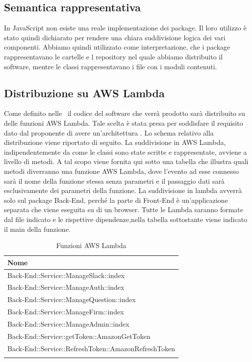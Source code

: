 \documentclass[../DefinizioneDiProdotto_v2.0.0.tex]{subfiles}
\begin{document}
\subsection{Semantica rappresentativa}
In JavaScript non esiste una reale implementazione dei package. Il loro utilizzo è stato quindi dichiarato per rendere una chiara suddivisione logica dei vari componenti.
Abbiamo quindi utilizzato come interpretazione, che i package rappresentavano le cartelle e l repository nel quale abbiamo distribuito il software, mentre le classi rappresentavano i file con i moduli contenuti.

\subsection{Distribuzione su AWS Lambda}
Come definito nelle \normediprogettov\ il codice del software che verrà prodotto sarà distribuito su delle funzioni AWS Lambda. Tale scelta è stata presa per soddisfare il requisito dato dal proponente di avere un'architettura . Lo schema relativo alla distribuzione viene riportato di seguito.
La suddivisione in AWS Lambda, indipendentemente da come le classi sono state scritte
e rappresentate, avviene a livello di metodi. A tal scopo viene fornita qui sotto una tabella che illustra quali metodi diverranno una
funzione AWS Lambda, dove l'evento ad esse connesso sarà il nome della funzione stessa
senza parametri e il passaggio dati sarà esclusivamente dei parametri della funzione. La
suddivisione in lambda avverrà solo sul package Back-End, perché la parte di Front-End è
un'applicazione separata che viene eseguita su di un browser.
Tutte le Lambda saranno formate dal file indicato e le rispettive dipendenze,nella tabella sottostante viene indicato il main della funzione.
\begin{longtable}[c] { >{\centering\arraybackslash}p{10cm} }
	\toprule
	\centerline{\textbf{Nome}}                          \\
	\midrule
	Back-End::Service::ManageSlack::index               \\
	\addlinespace[0.3em]
	Back-End::Service::ManageAuth::index                \\
	\addlinespace[0.3em]
	Back-End::Service::ManageQuestion::index            \\
	\addlinespace[0.3em]
	Back-End::Service::ManageFirm::index                \\
	\addlinespace[0.3em]
	Back-End::Service::ManageAdmin::index               \\
	\addlinespace[0.3em]
	Back-End::Service::getToken::AmazonGetToken         \\
	\addlinespace[0.3em]
	Back-End::Service::RefreshToken::AmazonRefreshToken \\
	\bottomrule
	\caption{Funzioni AWS Lambda}
\end{longtable}
\end{document}
